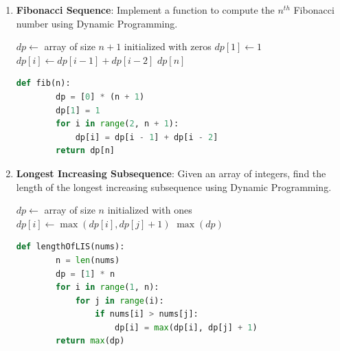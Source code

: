 \documentclass[12pt]{book} %
\begin{document}
\begin{enumerate}
    \item \textbf{Fibonacci Sequence}: Implement a function to compute the $n^{th}$ Fibonacci number using Dynamic Programming.
    
    \begin{algorithm}[H]
    \caption{Dynamic Programming Solution for Fibonacci Sequence}
    \begin{algorithmic}[1]
        \State $dp \gets$ array of size $n+1$ initialized with zeros
        \State $dp[1] \gets 1$
            \State $dp[i] \gets dp[i-1] + dp[i-2]$
        \EndFor
        \State \Return $dp[n]$
    \EndFunction
    \end{algorithmic}
    \end{algorithm}
    
    \FloatBarrier
    \begin{lstlisting}[language=Python]
    def fib(n):
        dp = [0] * (n + 1)
        dp[1] = 1
        for i in range(2, n + 1):
            dp[i] = dp[i - 1] + dp[i - 2]
        return dp[n]
    \end{lstlisting}
    \FloatBarrier
    
    \item \textbf{Longest Increasing Subsequence}: Given an array of integers, find the length of the longest increasing subsequence using Dynamic Programming.
    
    \begin{algorithm}[H]
    \caption{Dynamic Programming Solution for Longest Increasing Subsequence}
    \begin{algorithmic}[1]
        \State $dp \gets$ array of size $n$ initialized with ones
                    \State $dp[i] \gets \max(dp[i], dp[j]+1)$
                \EndIf
            \EndFor
        \EndFor
        \State \Return $\max(dp)$
    \EndFunction
    \end{algorithmic}
    \end{algorithm}
    
    \FloatBarrier
    \begin{lstlisting}[language=Python]
    def lengthOfLIS(nums):
        n = len(nums)
        dp = [1] * n
        for i in range(1, n):
            for j in range(i):
                if nums[i] > nums[j]:
                    dp[i] = max(dp[i], dp[j] + 1)
        return max(dp)
    \end{lstlisting}
    \FloatBarrier
    
    
\end{enumerate}
\end{document}
